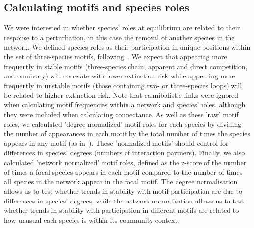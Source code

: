 \documentclass[12pt]{article}
\begin{document}
	\subsection*{Calculating motifs and species roles}

		We were interested in whether species' roles at equilibrium are related to their response to a perturbation, in this case the removal of another species in the network. We defined species roles as their participation in unique positions within the set of three-species motifs, following~\citet{Stouffer2012,Cirtwill2015}. We expect that appearing more frequently in stable motifs (three-species chain, apparent and direct competition, and omnivory) will correlate with lower extinction risk while appearing more frequently in unstable motifs (those containing two- or three-species loops) will be related to higher extinction risk.	Note that cannibalistic links were ignored when calculating motif frequencies within a network and species' roles, although they were included when calculating connectance. As well as these 'raw' motif roles, we calculated 'degree normalized' motif roles for each species by dividing the number of appearances in each motif by the total number of times the species appears in any motif (as in~\citet{Cirtwill2015}). These 'normalized motifs' should control for differences in species' degrees (numbers of interaction partners). Finally, we also calculated 'network normalized' motif roles, defined as the z-score of the number of times a focal species appears in each motif compared to the number of times all species in the network appear in the focal motif.
		The degree normalisation allows us to test whether trends in stability with motif participation are due to differences in species' degrees, while the network normalisation allows us to test whether trends in stability with participation in different motifs are related to how unusual each species is within its community context.


\end{document}
